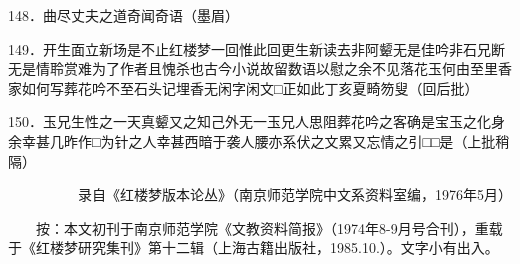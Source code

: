 148．曲尽丈夫之道奇闻奇语{（\kaishu 墨眉）}

149．开生面立新场是不止红楼梦一回惟此回更生新读去非阿颦无是佳吟非石兄断无是情聆赏难为了作者且愧杀也古今小说故留数语以慰之余不见落花玉何由至里香家如何写葬花吟不至石头记埋香无闲字闲文□正如此丁亥夏畸笏叟{（\kaishu 回后批）}

150．玉兄生性之一天真颦又之知己外无一玉兄人思阻葬花吟之客确是宝玉之化身余幸甚几昨作□为针之人幸甚西暗于袭人腰亦系伏之文累又忘情之引□□是{（\kaishu 上批稍隔）}

{　　　　　录自《红楼梦版本论丛》（南京师范学院中文系资料室编，1976年5月）}

{　　按：本文初刊于南京师范学院《文教资料简报》（1974年8-9月号合刊），重载于《红楼梦研究集刊》第十二辑（上海古籍出版社，1985.10.）。文字小有出入。}
